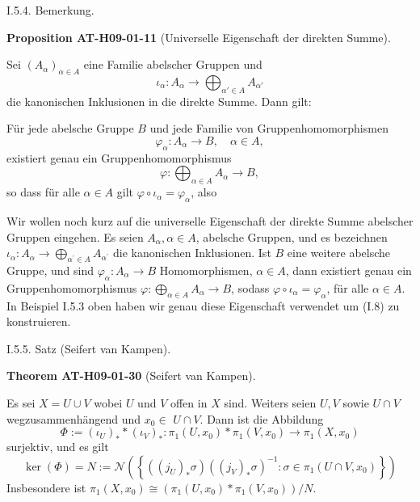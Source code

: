 \documentclass[10pt, letterpaper]{article}
\newcommand{\CustomHeading}[3]{%
  \par\medskip\noindent%
  \textbf{#1 #2} \textnormal{(#3)}.\enskip%
}
\newenvironment{PROP}[2]{\begin{unitbox}\CustomHeading{Proposition}{#1}{#2}}{\end{unitbox}}
\newenvironment{THEO}[2]{\begin{unitbox}\CustomHeading{Theorem}{#1}{#2}}{\end{unitbox}}
\begin{document}
I.5.4. Bemerkung. 



\begin{PROP}{AT-H09-01-11}{Universelle Eigenschaft der direkten Summe}
Sei $(A_\alpha)_{\alpha \in A}$ eine Familie abelscher Gruppen und
\[
\iota_\alpha : A_\alpha \rightarrow \bigoplus_{\alpha' \in A} A_{\alpha'}
\]
die kanonischen Inklusionen in die direkte Summe. Dann gilt:

Für jede abelsche Gruppe $B$ und jede Familie von Gruppenhomomorphismen
\[
\varphi_\alpha : A_\alpha \rightarrow B, \quad \alpha \in A,
\]
existiert genau ein Gruppenhomomorphismus
\[
\varphi : \bigoplus_{\alpha \in A} A_\alpha \rightarrow B,
\]
so dass für alle $\alpha \in A$ gilt $\varphi \circ \iota_\alpha = \varphi_\alpha$, also
\begin{center}
\end{center}
\end{PROP}




Wir wollen noch kurz auf die universelle Eigenschaft der direkte Summe abelscher Gruppen eingehen. Es seien $A_\alpha, \alpha \in A$, abelsche Gruppen, und es bezeichnen $\iota_\alpha: A_\alpha \rightarrow \bigoplus_{\alpha^{\prime} \in A} A_{\alpha^{\prime}}$ die kanonischen Inklusionen. Ist $B$ eine weitere abelsche Gruppe, und sind $\varphi_\alpha: A_\alpha \rightarrow B$ Homomorphismen, $\alpha \in A$, dann existiert genau ein Gruppenhomomorphismus $\varphi: \bigoplus_{\alpha \in A} A_\alpha \rightarrow B$, sodass $\varphi \circ \iota_\alpha=\varphi_\alpha$, für alle $\alpha \in A$. In Beispiel I.5.3 oben haben wir genau diese Eigenschaft verwendet um (I.8) zu konstruieren.





I.5.5. Satz (Seifert van Kampen). 

\begin{THEO}{AT-H09-01-30}{Seifert van Kampen}
Es sei $X=U \cup V$ wobei $U$ und $V$ offen in $X$ sind. Weiters seien $U, V$ sowie $U \cap V$ wegzusammenhängend und $x_0 \in$ $U \cap V$. Dann ist die Abbildung
$$\Phi:=\left(\iota_U\right)_* *\left(\iota_V\right)_*: \pi_1\left(U, x_0\right) * \pi_1\left(V, x_0\right) \rightarrow \pi_1\left(X, x_0\right)$$
surjektiv, und es gilt 
$$\operatorname{ker}(\Phi)= N:=\mathcal{N}\left(\left\{\left(\left(j_U\right)_* \sigma\right)\left(\left(j_V\right)_* \sigma\right)^{-1}: \sigma \in \pi_1\left(U \cap V, x_0\right)\right\}\right)$$ 
Insbesondere ist $\pi_1\left(X, x_0\right) \cong\left(\pi_1\left(U, x_0\right) * \pi_1\left(V, x_0\right)\right) / N$.
\end{THEO}
\end{document}

